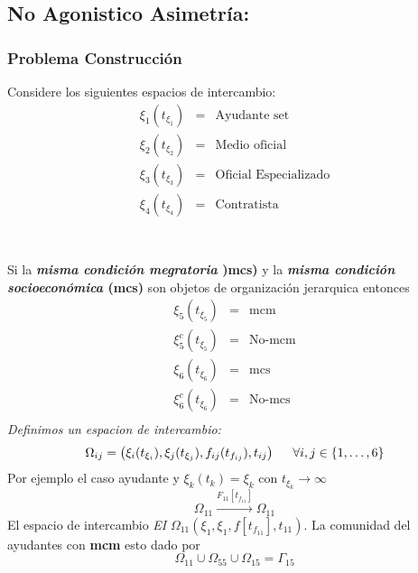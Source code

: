 \documentclass[]{article}
\begin{document}
\hrulefill 
\subsection{No Agonistico Asimetr\'ia:}
\subsubsection{Problema Construcci\'on}
Considere los siguientes espacios de intercambio: \\

\begin{eqnarray*}
		\xi_1(t_{\xi_1})&=& \text{Ayudante set}\\
		\xi_2(t_{\xi_2})&=& \text{Medio oficial}\\
		\xi_3(t_{\xi_3})&=& \text{Oficial Especializado}\\
		\xi_4(t_{\xi_4})&=& \text{Contratista}\\
\end{eqnarray*}
\\
\emph{\underline{}}\\
Si la \textbf{ \textit{misma condici\'on megratoria} )mcs)} y la \textbf{ \textit{misma condici\'on socioecon\'omica} (mcs)} son objetos de organizaci\'on jerarquica entonces
\begin{eqnarray*}
	\xi_5(t_{\xi_5})&=&\text{mcm}\\
	\xi_5^c(t_{\xi_5})&=&\text{No-mcm}\\
	\xi_6(t_{\xi_6})&=&\text{mcs}\\
	\xi_6^c(t_{\xi_6})&=&\text{No-mcs}\\
\end{eqnarray*} 
\emph{Definimos un espacion de intercambio:}\\
\begin{equation}
	\Omega_{ij} = \left( \xi_i (t_{\xi_i} ), \xi_j (t_{\xi_j}), f_{ij}(t_{f_{ij}}), t_{ij} \right) \hspace{0.5cm} \forall i, j \in \{1,\dots,6\}
\end{equation}
Por ejemplo el caso ayudante y $\xi_k(t_k)=\xi_k$ con $t_{\xi_k}\rightarrow \infty$
\begin{equation}
	\Omega_{11}\xrightarrow{F_{11}[t_{f_{11}}]}\Omega_{11}
\end{equation}
El espacio de intercambio \textit{EI} $\Omega_{11} (\xi_1, \xi_1, f[t_{f_{11}}], t_11)$. La comunidad del ayudantes con \textbf{mcm} esto dado por 
\begin{equation}
	\Omega_{11} \cup \Omega_{55} \cup \Omega_15 = \Gamma_{15}
\end{equation} 
\begin{center}
\end{center}
\end{document}
